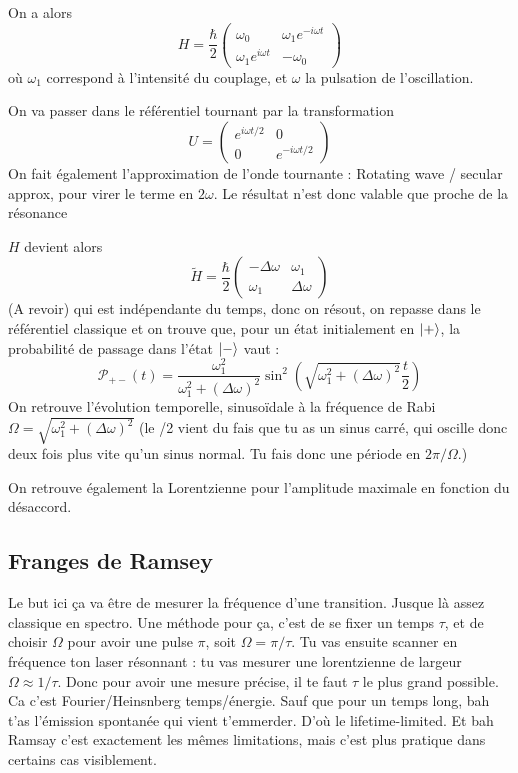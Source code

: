 \documentclass[a4paper]{report}
\begin{document}
   On a alors \begin{equation}
    H=\dfrac{\hbar}{2} \begin{pmatrix} \omega_0 & \omega_1 e^{-i\omega t} \\ \omega_1 e^{i\omega t} & -\omega_0  \end{pmatrix}
\end{equation}    où $\omega_1$ correspond à l'intensité du couplage, et $\omega$ la pulsation de l'oscillation.
   
   On va passer dans le référentiel tournant par la transformation \begin{equation}
   U=\begin{pmatrix} e^{i\omega t/2} & 0 \\ 0 & e^{-i\omega t/2}  \end{pmatrix}
   \end{equation}On fait également l'approximation de l'onde tournante : Rotating wave / secular approx, pour virer le terme en $2\omega$. Le résultat n'est donc valable que proche de la résonance 
   
   $H$ devient alors \begin{equation}
   \tilde{H}=\dfrac{\hbar}{2} \begin{pmatrix} -\Delta\omega & \omega_1  \\ \omega_1 & \Delta\omega  \end{pmatrix}
   \end{equation} (A revoir) qui est indépendante du temps, donc on résout, on repasse dans le référentiel classique et on trouve que, pour un état initialement en $\ket{+}$, la probabilité de passage dans l'état $\ket{-}$ vaut : \begin{equation}
   \mathcal{P}_{+-}(t)=\dfrac{\omega_1^2}{\omega_1^2+(\Delta\omega)^2}\sin^2(\sqrt{\omega_1^2+(\Delta\omega)^2}\dfrac{t}{2})
   \end{equation}
   On retrouve l'évolution temporelle, sinusoïdale à la fréquence de Rabi $\Omega=\sqrt{\omega_1^2+(\Delta\omega)^2}$ (le /2 vient du fais que tu as un sinus carré, qui oscille donc deux fois plus vite qu'un sinus normal. Tu fais donc une période en $2\pi/\Omega$.)
   
   On retrouve également la Lorentzienne pour l'amplitude maximale en fonction du désaccord.
   
   \subsection{Franges de Ramsey}
   Le but ici ça va être de mesurer la fréquence d'une transition. Jusque là assez classique en spectro. Une méthode pour ça, c'est de se fixer un temps $\tau$, et de choisir $\Omega$ pour avoir une pulse $\pi$, soit $\Omega=\pi/\tau$. Tu vas ensuite scanner en fréquence ton laser résonnant : tu vas mesurer une lorentzienne de largeur $\Omega \approx 1/\tau$. Donc pour avoir une mesure précise, il te faut $\tau$ le plus grand possible. Ca c'est Fourier/Heinsnberg temps/énergie. Sauf que pour un temps long, bah t'as l'émission spontanée qui vient t'emmerder. D'où le lifetime-limited. Et bah Ramsay c'est exactement les mêmes limitations, mais c'est plus pratique dans certains cas visiblement.
   
\end{document}
